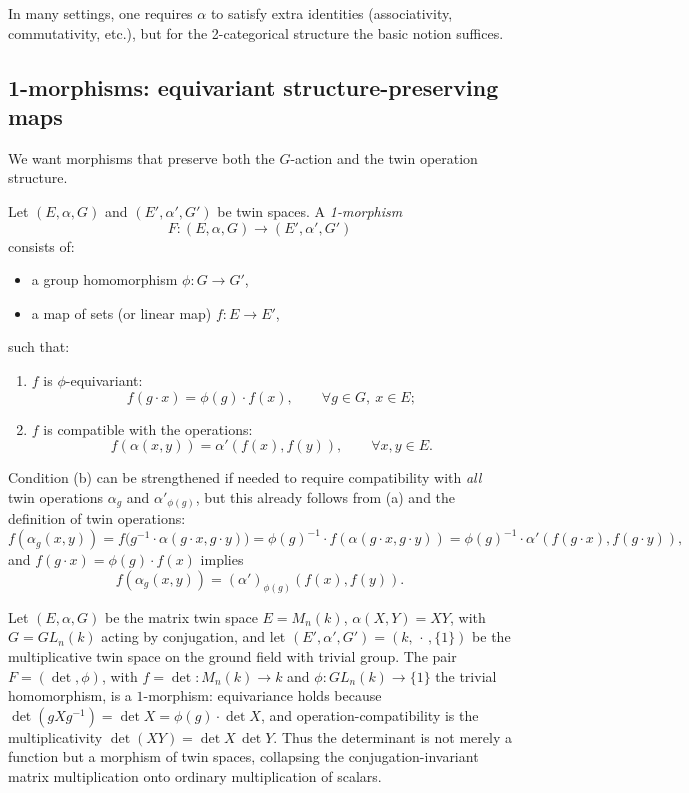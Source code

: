 \documentclass[11pt,a4paper]{article}
\numberwithin{equation}{section}
\newcommand{\TwinSpace}{(E,\alpha,G)}
\begin{document}
	In many settings, one requires $\alpha$ to satisfy extra identities (associativity, commutativity, etc.),
	but for the 2-categorical structure the basic notion suffices.
	
	\subsection{1-morphisms: equivariant structure-preserving maps}
	
	We want morphisms that preserve both the $G$-action and the twin operation structure.
	
	\begin{definition}
		Let $\TwinSpace$ and $(E',\alpha',G')$ be twin spaces.
		A \emph{1-morphism} 
		\[
		F : (E,\alpha,G)\longrightarrow (E',\alpha',G')
		\]
		consists of:
		\begin{itemize}
			\item a group homomorphism $\phi:G\to G'$,
			\item a map of sets (or linear map) $f:E\to E'$,
		\end{itemize}
		such that:
		\begin{enumerate}[label=(\alph*)]
			\item $f$ is $\phi$-equivariant:
			\[
			f(g\cdot x) = \phi(g)\cdot f(x), \qquad \forall g\in G,\ x\in E;
			\]
			\item $f$ is compatible with the operations:
			\[
			f(\alpha(x,y)) = \alpha'(f(x),f(y)), \qquad \forall x,y\in E.
			\]
		\end{enumerate}
	\end{definition}
	
	\begin{remark}
		Condition (b) can be strengthened if needed to require compatibility with \emph{all} twin operations
		$\alpha_g$ and $\alpha'_{\phi(g)}$, but this already follows from (a) and the definition of twin operations:
		\[
		f(\alpha_g(x,y))
		= f\big(g^{-1}\cdot \alpha(g\cdot x,g\cdot y)\big)
		= \phi(g)^{-1}\cdot f(\alpha(g\cdot x,g\cdot y))
		= \phi(g)^{-1}\cdot \alpha'(f(g\cdot x),f(g\cdot y)),
		\]
		and $f(g\cdot x)=\phi(g)\cdot f(x)$ implies
		\[
		f(\alpha_g(x,y)) = (\alpha')_{\phi(g)}(f(x),f(y)).
		\]
	\end{remark}
	
	\begin{example}\label{ex:det-morphism}
		Let $\TwinSpace$ be the matrix twin space $E=M_n(k)$, $\alpha(X,Y)=XY$, with $G=GL_n(k)$ acting by
		conjugation, and let $(E',\alpha',G')=(k,\,\cdot\,,\{1\})$ be the multiplicative twin space on the ground
		field with trivial group. The pair $F=(\det,\phi)$, with $f=\det:M_n(k)\to k$ and $\phi:GL_n(k)\to\{1\}$
		the trivial homomorphism, is a $1$-morphism: equivariance holds because
		$\det(gXg^{-1})=\det X=\phi(g)\cdot\det X$, and operation-compatibility is the multiplicativity
		$\det(XY)=\det X\,\det Y$. Thus the determinant is not merely a function but a morphism of twin spaces,
		collapsing the conjugation-invariant matrix multiplication onto ordinary multiplication of scalars.
	\end{example}
\end{document}

